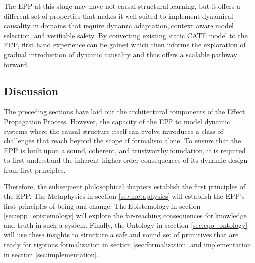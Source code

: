 The EPP at this stage may have not causal structural learning, but it offers a different set of properties that makes it well suited to implement dynamical causality in domains that require dynamic adaptation, context aware model selection, and verifiable safety. By converting existing static CATE model to the EPP, first hand experience can be gained which then informs the exploration of gradual introduction of dynamic causality and thus offers a scalable pathway forward.  


\subsection{Discussion}
\label{sec:epp_discussion}

The preceding sections have laid out the architectural components of the Effect Propagation Process. However, the capacity of the EPP to model dynamic systems where the causal structure itself can evolve introduces a class of challenges that reach beyond the scope of formalism alone. To ensure that the EPP is built upon a sound, coherent, and trustworthy foundation, it is required to first understand the inherent higher-order consequences of its dynamic design from first principles.

Therefore, the subsequent philosophical chapters establish the first principles of the EPP. The Metaphysics in section \ref{sec:metaphysics} will establish the EPP's first principles of being and change. The Epistemology in section \ref{sec:epp_epistemology} will explore the far-reaching consequences for knowledge and truth in such a system. Finally, the Ontology in secction \ref{sec:epp_ontology} will use these insights to structure a safe and sound set of primitives that are ready for rigorous formalization in section \ref{sec:formalization} and implementation in section \ref{sec:implementation}. 

\newpage
